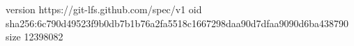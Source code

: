 version https://git-lfs.github.com/spec/v1
oid sha256:6c790d49523f9b0db7b1b76a2fa5518c1667298daa90d7dfaa9090d6ba438790
size 12398082
